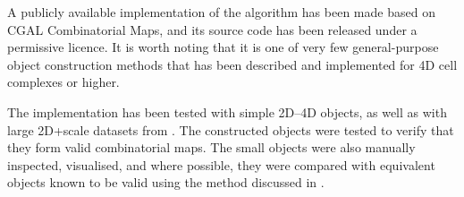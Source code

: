 A publicly available implementation of the algorithm has been made based on CGAL Combinatorial Maps, and its source code has been released under a permissive licence.
It is worth noting that it is one of very few general-purpose object construction methods that has been described and implemented for 4D cell complexes or higher.

The implementation has been tested with simple 2D--4D objects, as well as with large 2D+scale datasets from \citet{Meijers11}.
The constructed objects were tested to verify that they form valid combinatorial maps.
The small objects were also manually inspected, visualised, and where possible, they were compared with equivalent objects known to be valid using the method discussed in .
